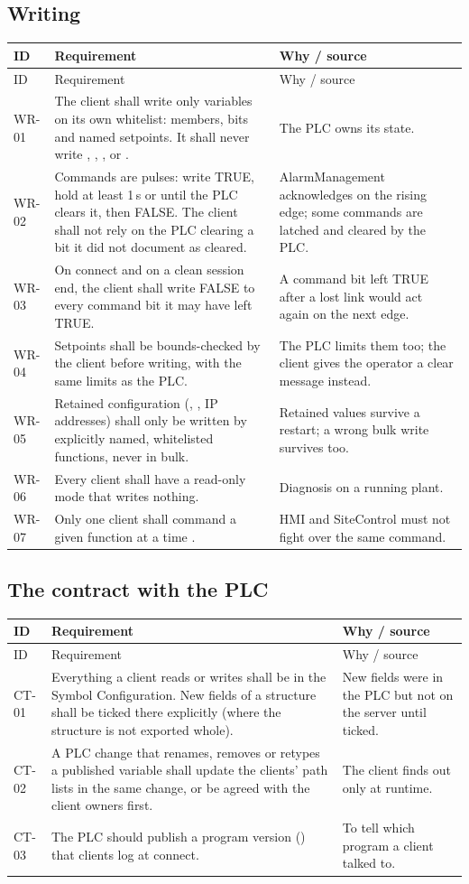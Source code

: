 \documentclass[11pt,a4paper]{article}
\makeatletter
\newenvironment{reqtable}{%
  \begin{small}
  \setlength{\tabcolsep}{4pt}%
  \begin{longtable}{@{}P{14mm}P{86mm}P{60mm}@{}}
  \toprule
  ID & Requirement & Why / source\\
  \midrule
  \endfirsthead
  \toprule
  ID & Requirement & Why / source\\
  \midrule
  \endhead
  \bottomrule
  \endfoot
}{%
  \end{longtable}
  \end{small}
}
\makeatother
\begin{document}
\subsection{Writing}
\begin{reqtable}
WR-01 & The client shall write only variables on its own whitelist:  members, 
bits and named setpoints. It shall never write , , ,
 or . & The PLC owns its state.\\
WR-02 & Commands are pulses: write TRUE, hold at least 1\,s or until the PLC clears it, then FALSE.
The client shall not rely on the PLC clearing a bit it did not document as cleared. & AlarmManagement
acknowledges on the rising edge; some commands are latched and cleared by the PLC.\\
WR-03 & On connect and on a clean session end, the client shall write FALSE to every command bit it may
have left TRUE. & A command bit left TRUE after a lost link would act again on the next edge.\\
WR-04 & Setpoints shall be bounds-checked by the client before writing, with the same limits as the PLC.
& The PLC limits them too; the client gives the operator a clear message instead.\\
WR-05 & Retained configuration (, , IP addresses) shall only be written by
explicitly named, whitelisted functions, never in bulk. & Retained values survive a restart; a wrong bulk
write survives too.\\
WR-06 & Every client shall have a read-only mode that writes nothing. & Diagnosis on a running plant.\\
WR-07 & Only one client shall command a given function at a time . & HMI and SiteControl must not
fight over the same command.\\
\end{reqtable}

\subsection{The contract with the PLC}
\label{sec:contract}
\begin{reqtable}
CT-01 & Everything a client reads or writes shall be in the Symbol Configuration. New fields of a
structure shall be ticked there explicitly (where the structure is not exported whole). & New fields
were in the PLC but not on the server until ticked.\\
CT-02 & A PLC change that renames, removes or retypes a published variable shall update the clients'
path lists in the same change, or be agreed with the client owners first. & The client finds out only at
runtime.\\
CT-03 & The PLC should publish a program version () that clients log at connect. & To tell
which program a client talked to.\\
\end{reqtable}
\end{document}
